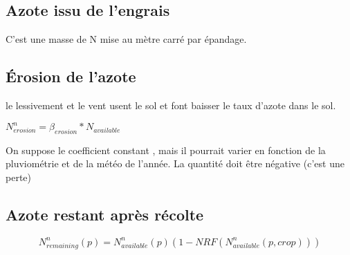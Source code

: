 \documentclass[10pt,a4paper,french]{article} %
\begin{document}
\subsection{Azote issu de l'engrais}


C'est une masse de N mise au mètre carré par épandage.


\subsection{Érosion de l'azote}

le lessivement et  le vent usent le sol et font baisser le taux d'azote dans le sol. 

$N_{erosion}^n = \beta_{erosion}* N_{available}$


On suppose le coefficient constant , mais il pourrait varier en fonction de la pluviométrie et de la météo de l'année.
La quantité doit être négative (c'est une perte) 

\subsection{Azote restant après récolte}


\begin{equation}
N_{remaining}^{n}(p)=N_{available}^{n}(p) (1 - NRF(N_{available}^{n}(p, crop))) 
\end{equation}
\end{document}
